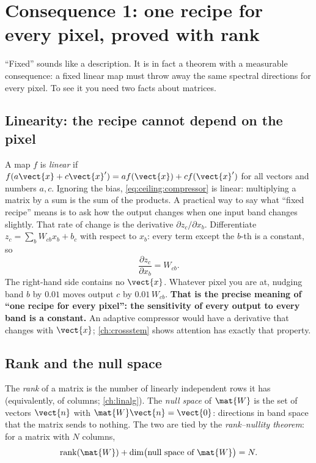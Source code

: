 \section{Consequence 1: one recipe for every pixel, proved with rank}\label{sec:ceiling:fixed}

``Fixed'' sounds like a description. It is in fact a theorem with a measurable consequence: a fixed linear map must throw away the same spectral directions for every pixel. To see it you need two facts about matrices.

\subsection{Linearity: the recipe cannot depend on the pixel}

A map $f$ is \emph{linear} if $f(a\vect{x} + c\vect{x}') = a f(\vect{x}) + c f(\vect{x}')$ for all vectors and numbers $a, c$. Ignoring the bias, \cref{eq:ceiling:compressor} is linear: multiplying a matrix by a sum is the sum of the products. A practical way to say what ``fixed recipe'' means is to ask how the output changes when one input band changes slightly. That rate of change is the derivative $\partial z_c/\partial x_b$. Differentiate $z_c = \sum_{b} W_{cb}x_b + b_c$ with respect to $x_b$: every term except the $b$-th is a constant, so
\begin{equation}\label{eq:ceiling:jacobian}
  \frac{\partial z_c}{\partial x_b} = W_{cb}.
\end{equation}
The right-hand side contains no $\vect{x}$. Whatever pixel you are at, nudging band $b$ by $0.01$ moves output $c$ by $0.01\,W_{cb}$. \textbf{That is the precise meaning of ``one recipe for every pixel'': the sensitivity of every output to every band is a constant.} An adaptive compressor would have a derivative that changes with $\vect{x}$; \cref{ch:crossstem} shows attention has exactly that property.

\subsection{Rank and the null space}

The \emph{rank} of a matrix is the number of linearly independent rows it has (equivalently, of columns; \cref{ch:linalg}). The \emph{null space} of $\mat{W}$ is the set of vectors $\vect{n}$ with $\mat{W}\vect{n} = \vect{0}$: directions in band space that the matrix sends to nothing. The two are tied by the \emph{rank--nullity theorem}: for a matrix with $N$ columns,
\begin{equation}\label{eq:ceiling:ranknullity}
  \operatorname{rank}(\mat{W}) + \dim\bigl(\text{null space of }\mat{W}\bigr) = N .
\end{equation}

